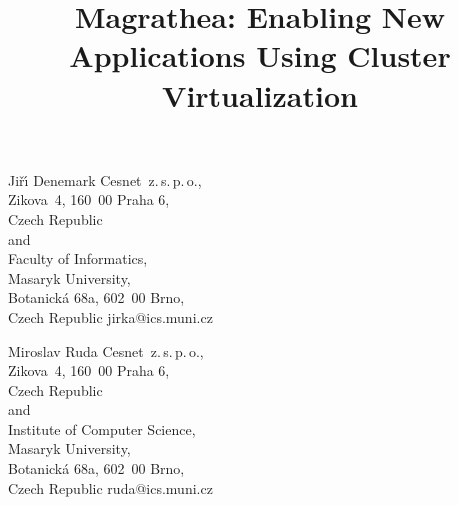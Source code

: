 \documentclass{sigplanconf}
\begin{document}


\title{Magrathea: Enabling New Applications Using Cluster Virtualization}

\authorinfo
    {Ji\v{r}\'\i{} Denemark}
{%
Cesnet~z.\,s.\,p.\,o.,\\
Zikova~4, 160~00 Praha 6,\\
Czech Republic\\
and\\
Faculty of Informatics, \\
Masaryk University,\\
Botanick\'a 68a, 602~00 Brno,\\
Czech Republic
}
    {jirka@ics.muni.cz}

\authorinfo
    {Miroslav Ruda}
{%
Cesnet~z.\,s.\,p.\,o.,\\
Zikova~4, 160~00 Praha 6,\\
Czech Republic\\
and\\
Institute of Computer Science,\\
Masaryk University,\\
Botanick\'a 68a, 602~00 Brno,\\
Czech Republic}
    {ruda@ics.muni.cz}


\maketitle
\end{document}
